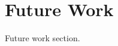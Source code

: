 \ifx\mainfile\undefined

\setcounter{chapter}{8} %
\fi

\cleardoublepage
\chapter{Future Work}
\label{chap:future}

Future work section.

\ifx\mainfile\undefined

\fi
